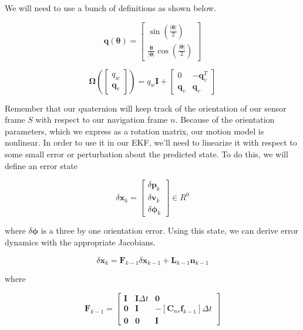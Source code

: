 We will need to use a bunch of definitions as shown below. 


\begin{equation}
\mathbf{q}(\boldsymbol{\theta})  = 
\begin{bmatrix}
\sin(\frac{|\boldsymbol{\theta}|}{2}) \\
\frac{\boldsymbol{\theta}}{|\boldsymbol{\theta}|}\cos(\frac{|\boldsymbol{\theta}|}{2})
\end{bmatrix} 
\end{equation}

\begin{equation}
\boldsymbol{\Omega}( 
\begin{bmatrix}
q_w \\
\mathbf{q}_{v}
\end{bmatrix}) = q_w \mathbf{I} + 
\begin{bmatrix}
0 & - \mathbf{q}_{v}^T \\
\mathbf{q}_{v} & \mathbf{q}_{v} 
\end{bmatrix}
\end{equation}

Remember that our quaternion will keep track of
the orientation of our sensor frame $S$ with respect to
our navigation frame $n$. Because of the orientation parameters, which we express as
a rotation matrix, our motion model is nonlinear. In order to use it in our EKF, we'll need to linearize
it with respect to some small error or perturbation about
the predicted state. To do this, we will define an error state

\begin{equation}
\delta \mathbf{x}_k = 
\begin{bmatrix}
\delta \mathbf{p}_k \\
\delta \mathbf{v}_k \\
\delta \boldsymbol{\phi}_k
\end{bmatrix} \in R^9
\end{equation}

where $\delta \boldsymbol{\phi}$ is a three by one orientation error. Using this state,
we can derive error dynamics with the appropriate Jacobians. 

\begin{equation}
\delta \mathbf{x}_k = \mathbf{F}_{k - 1} \delta \mathbf{x}_{k-1} + \mathbf{L}_{k-1} \mathbf{n}_{k-1}
\end{equation}

where

\begin{equation}
\mathbf{F}_{k-1} = 
\begin{bmatrix}
\mathbf{I} & \mathbf{I}\Delta t & \mathbf{0} \\
\mathbf{0} & \mathbf{I} & - [\mathbf{C}_{ns}\mathbf{f}_{k-1}]\Delta t \\
\mathbf{0} & \mathbf{0} & \mathbf{I} 
\end{bmatrix}
\end{equation}

